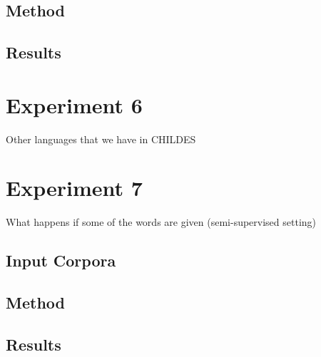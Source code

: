 \subsection{Method}
\subsection{Results}

\section{Experiment 6}
Other languages that we have in CHILDES

\section{Experiment 7}
What happens if some of the words are given (semi-supervised setting)

\subsection{Input Corpora}
\subsection{Method}
\subsection{Results}



